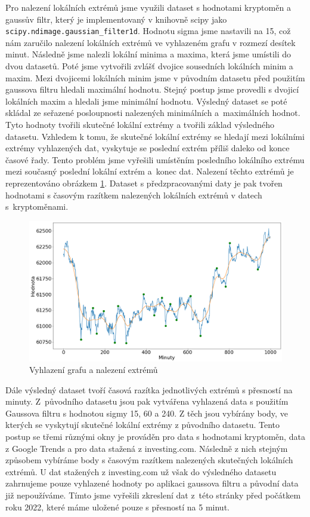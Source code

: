 Pro nalezení lokálních extrémů jsme využili dataset s hodnotami kryptoměn a gaussův filtr, který je implementovaný v knihovně scipy jako \verb|scipy.ndimage.gaussian_filter1d|.
Hodnotu sigma jsme nastavili na 15, což nám zaručilo nalezení lokálních extrémů ve vyhlazeném grafu v rozmezí desítek minut.
Následně jsme nalezli lokální minima a maxima, která jsme umístili do dvou datasetů.
Poté jsme vytvořili zvlášť dvojice sousedních lokálních minim a maxim.
Mezi dvojicemi lokálních minim jsme v původním datasetu před použitím gaussova filtru hledali maximální hodnotu.
Stejný postup jsme provedli s dvojicí lokálních maxim a hledali jsme minimální hodnotu.
Výsledný dataset se poté skládal ze seřazené posloupnosti nalezených minimálních a~maximálních hodnot.
Tyto hodnoty tvořili skutečné lokální extrémy a tvořili základ výsledného datasetu.
Vzhledem k tomu, že skutečné lokální extrémy se hledají mezi lokálními extrémy vyhlazených dat, vyskytuje se poslední extrém příliš daleko od konce časové řady.
Tento problém jsme vyřešili umístěním posledního lokálního extrému mezi současný poslední lokální extrém a~konec dat.
Nalezení těchto extrémů je reprezentováno obrázkem \ref{visual:smooth}.
Dataset s předzpracovanými daty je pak tvořen hodnotami s časovým razítkem nalezených lokálních extrémů v datech s~kryptoměnami.

\begin{figure}
    \caption{Vyhlazení grafu a nalezení extrémů}
    \label{visual:smooth}
    \centering
    \includegraphics[width=\textwidth]{smooth.png}
\end{figure}

Dále výsledný dataset tvoří časová razítka jednotlivých extrémů s přesností na minuty. 
Z~původního datasetu jsou pak vytvářena vyhlazená data s použitím Gaussova filtru s hodnotou sigmy 15, 60 a 240. 
Z těch jsou vybírány body, ve kterých se vyskytují skutečné lokální extrémy z původního datasetu. 
Tento postup se třemi různými okny je prováděn pro data s hodnotami kryptoměn, data z Google Trends a pro data stažená z investing.com. 
Následně z nich stejným způsobem vybíráme body s časovým razítkem nalezených skutečných lokálních extrémů. 
U dat stažených z investing.com už však do výsledného datasetu zahrnujeme pouze vyhlazené hodnoty po aplikaci gaussova filtru a původní data již nepoužíváme. 
Tímto jsme vyřešili zkreslení dat z~této stránky před počátkem roku 2022, které máme uložené pouze s přesností na 5 minut.

